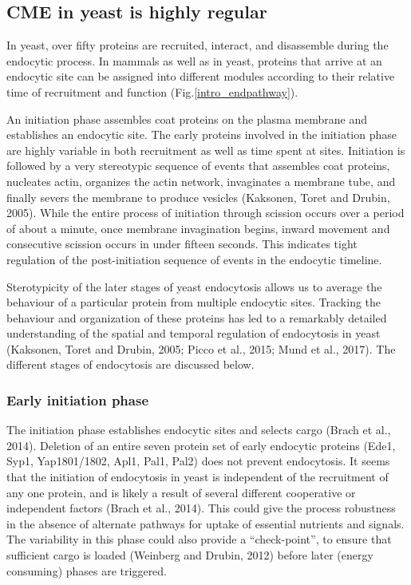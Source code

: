 	
		\subsection{CME in yeast is highly regular}
	In yeast, over fifty proteins are recruited, interact, and disassemble during the endocytic process. In mammals as well as in yeast, proteins that arrive at an endocytic site can be assigned into different modules according to their relative time of recruitment and function (Fig.\ref{intro_endpathway}). 

\vspace{5mm}
An initiation phase assembles coat proteins on the plasma membrane and establishes an endocytic site. The early proteins involved in the initiation phase are highly variable in both recruitment as well as time spent at sites. Initiation is followed by a very stereotypic sequence of events that assembles coat proteins, nucleates actin, organizes the actin network, invaginates a membrane tube, and finally severs the membrane to produce vesicles (Kaksonen, Toret and Drubin, 2005). While the entire process of initiation through scission occurs over a period of about a minute, once membrane invagination begins, inward movement and consecutive scission occurs in under fifteen seconds. This indicates tight regulation of the post-initiation sequence of events in the endocytic timeline. 

		\vspace{5mm}
Sterotypicity of the later stages of yeast endocytosis allows us to average the behaviour of a particular protein from multiple endocytic sites. Tracking the behaviour and organization of these proteins has led to a remarkably detailed understanding of the spatial and temporal regulation of endocytosis in yeast (Kaksonen, Toret and Drubin, 2005; Picco et al., 2015; Mund et al., 2017). The different stages of endocytosis are discussed below. 

		
 


			\subsubsection{Early initiation phase}
The initiation phase establishes endocytic sites and selects cargo (Brach et al., 2014). Deletion of an entire seven protein set of early endocytic proteins (Ede1, Syp1, Yap1801/1802, Apl1, Pal1, Pal2) does not prevent endocytosis. It seems that the initiation of endocytosis in yeast is independent of the recruitment of any one protein, and is likely a result of several different cooperative or independent factors (Brach et al., 2014). This could give the process robustness in the absence of alternate pathways for uptake of essential nutrients and signals. The variability in this phase could also provide a “check-point”, to ensure that sufficient cargo is loaded (Weinberg and Drubin, 2012) before later (energy consuming) phases are triggered. 


